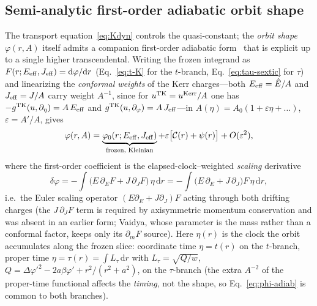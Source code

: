 \documentclass[12pt]{iopart}
\newcommand{\Ehat}{\hat E}
\newcommand{\dd}{\mathrm{d}}
\begin{document}
\subsection{Semi-analytic first-order adiabatic orbit shape}
\label{sec:adiabatic}
The transport equation~\eqref{eq:Kdyn} controls the quasi-constant; the
\emph{orbit shape} $\varphi(r,A)$ itself admits a companion first-order adiabatic
form~\cite{BornFock1928,BenderOrszag1999} that is explicit up to a single higher
transcendental. Writing the frozen integrand as
$F(r;E_{\rm eff},J_{\rm eff})=\dd\varphi/\dd r$ (Eq.~\eqref{eq:t-K} for the
$t$-branch, Eq.~\eqref{eq:tau-sextic} for $\tau$) and linearizing the
\emph{conformal weights} of the Kerr charges---both $E_{\rm eff}=\Ehat/A$ and
$J_{\rm eff}=J/A$ carry weight $A^{-1}$, since for $u^{\rm TK}=u^{\rm Kerr}/A$ one
has $-g^{\rm TK}(u,\partial_\eta)=A\,E_{\rm eff}$ and
$g^{\rm TK}(u,\partial_\varphi)=A\,J_{\rm eff}$---in
$A(\eta)=A_0(1+\varepsilon\eta+\dots)$, $\varepsilon=A'/A$, gives
\begin{equation}
    \varphi(r,A)=\underbrace{\varphi_0(r;E_{\rm eff},J_{\rm eff})}_{\text{frozen, Kleinian}}
    +\varepsilon\big[\mathcal{C}(r)+\psi(r)\big]+O(\varepsilon^2),
    \label{eq:phi-adiab}
\end{equation}
where the first-order coefficient is the elapsed-clock--weighted \emph{scaling}
derivative
\begin{equation}
    \delta\varphi=-\!\int\!\big(\Ehat\,\partial_E F+J\,\partial_J F\big)\,\eta\,\dd r
    =-\!\int\!\big(E\,\partial_E+J\,\partial_J\big)F\,\eta\,\dd r,
    \label{eq:deltaphi-EJ}
\end{equation}
i.e.\ the Euler scaling operator $(E\partial_E+J\partial_J)F$ acting through both
drifting charges (the $J\,\partial_J F$ term is required by axisymmetric momentum
conservation and was absent in an earlier form; Vaidya, whose parameter is the
mass rather than a conformal factor, keeps only its $\partial_m F$ source). Here
$\eta(r)$
is the clock the orbit accumulates along the frozen slice: coordinate time
$\eta=t(r)$ on the $t$-branch, proper time $\eta=\tau(r)=\int\!L_\tau\,\dd r$ with
$L_\tau=\sqrt{Q/w}$, $Q=\Delta\varphi'^2-2a\beta\varphi'+r^2/(r^2+a^2)$, on the
$\tau$-branch (the extra $A^{-2}$ of the proper-time functional affects the
\emph{timing}, not the shape, so Eq.~\eqref{eq:phi-adiab} is common to both
branches).
\end{document}
